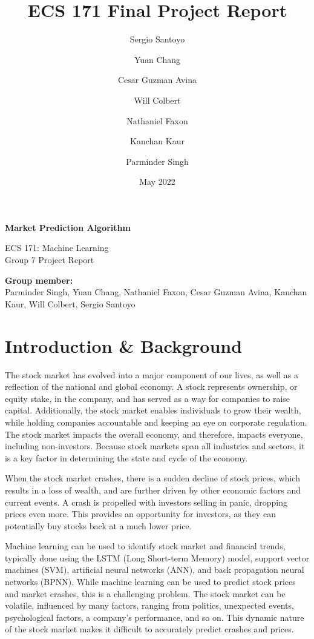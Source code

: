 \documentclass{article}
\title{ECS 171 Final Project Report}
\author{
  Sergio Santoyo\\
  \and
  Yuan Chang\\
  \and
  Cesar Guzman Avina\\
  \and
  Will Colbert\\
  \and
  Nathaniel Faxon\\
  \and
  Kanchan Kaur\\
  \and
  Parminder Singh\\
}
\date{May 2022}
\begin{document}
\begin{titlepage}
   \begin{center}
       \vspace*{4cm}
		\Large
       \textbf{Market Prediction Algorithm}

       \vspace{0.5cm}
        ECS 171: Machine Learning \\
        Group 7 Project Report
       \vspace{1.5cm}

       \textbf{Group member:}\\
Parminder Singh, Yuan Chang, Nathaniel Faxon, Cesar Guzman Avina, Kanchan Kaur, Will Colbert, Sergio Santoyo
       \vspace{0.8cm}
            
   \end{center}
\end{titlepage}


\section{Introduction \& Background}
The stock market has evolved into a major component of our lives, as well as a reflection of the national and global economy. A stock represents ownership, or equity stake, in the company, and has served as a way for companies to raise capital. Additionally, the stock market enables individuals to grow their wealth, while holding companies accountable and keeping an eye on corporate regulation. The stock market impacts the overall economy, and therefore, impacts everyone, including non-investors. Because stock markets span all industries and sectors, it is a key factor in determining the state and cycle of the economy.

When the stock market crashes, there is a sudden decline of stock prices, which results in a loss of wealth, and are further driven by other economic factors and current events. A crash is propelled with investors selling in panic, dropping prices even more. This provides an opportunity for investors, as they can potentially buy stocks back at a much lower price.

Machine learning can be used to identify stock market and financial trends, typically done using the LSTM (Long Short-term Memory) model, support vector machines (SVM), artificial neural networks (ANN), and back propagation neural networks (BPNN). While machine learning can be used to predict stock prices and market crashes, this is a challenging problem. The stock market can be volatile, influenced by many factors, ranging from politics, unexpected events, psychological factors, a company’s performance, and so on. This dynamic nature of the stock market makes it difficult to accurately predict crashes and prices.
\end{document}
